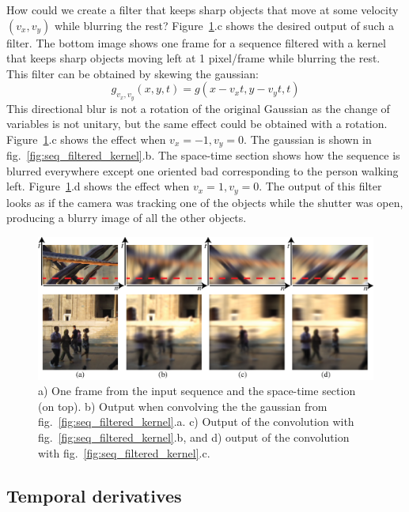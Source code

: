 How could we create a filter that keeps sharp objects that move at some velocity $(v_x,v_y)$ while blurring the rest? Figure~\ref{fig:sec_filtered_blur}.c shows the desired output of such a filter. The bottom image shows one frame for a sequence filtered with a kernel that keeps sharp objects moving left at 1 pixel/frame while blurring the rest. This filter can be obtained by skewing the gaussian:
\begin{equation}
    g_{v_x,v_y}(x,y,t) = g(x - v_xt,y - v_yt, t)
\end{equation}
This directional blur is not a rotation of the original Gaussian as the change of variables is not unitary, but the same effect could be obtained with a rotation. Figure~\ref{fig:sec_filtered_blur}.c shows the effect when $v_x=-1, v_y=0$. The gaussian is shown in fig.~\ref{fig:seq_filtered_kernel}.b. The space-time section shows how the sequence is blurred everywhere except one oriented bad corresponding to the person walking left. Figure~\ref{fig:sec_filtered_blur}.d shows the effect when $v_x=1, v_y=0$. The output of this filter looks as if the camera was tracking one of the objects while the shutter was open, producing a blurry image of all the other objects.

\begin{figure}
    \includegraphics[width=1\linewidth]{figures/temporal_filters/seq_filtered_blur.eps}
    \caption{a) One frame from the input sequence and the space-time section (on top). b) Output when convolving the the gaussian from fig.~\ref{fig:seq_filtered_kernel}.a. c) Output of the convolution with fig.~\ref{fig:seq_filtered_kernel}.b, and d) output of the convolution with fig.~\ref{fig:seq_filtered_kernel}.c.}
    \label{fig:sec_filtered_blur}
\end{figure}


\subsection{Temporal derivatives}

